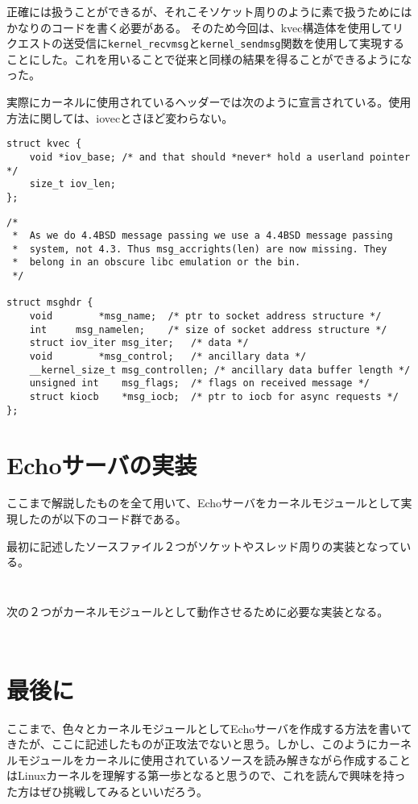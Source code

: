 正確には扱うことができるが、それこそソケット周りのように素で扱うためにはかなりのコードを書く必要がある。
そのため今回は、kvec構造体を使用してリクエストの送受信に\verb|kernel_recvmsg|と\verb|kernel_sendmsg|関数を使用して実現することにした。これを用いることで従来と同様の結果を得ることができるようになった。

実際にカーネルに使用されているヘッダーでは次のように宣言されている。使用方法に関しては、iovecとさほど変わらない。
\begin{verbatim}
struct kvec {
    void *iov_base; /* and that should *never* hold a userland pointer */
    size_t iov_len;
};
\end{verbatim}
\begin{verbatim}
/*
 *  As we do 4.4BSD message passing we use a 4.4BSD message passing
 *  system, not 4.3. Thus msg_accrights(len) are now missing. They
 *  belong in an obscure libc emulation or the bin.
 */
 
struct msghdr {
    void        *msg_name;  /* ptr to socket address structure */
    int     msg_namelen;    /* size of socket address structure */
    struct iov_iter msg_iter;   /* data */
    void        *msg_control;   /* ancillary data */
    __kernel_size_t msg_controllen; /* ancillary data buffer length */
    unsigned int    msg_flags;  /* flags on received message */
    struct kiocb    *msg_iocb;  /* ptr to iocb for async requests */
};
\end{verbatim}

\section{Echoサーバの実装}
ここまで解説したものを全て用いて、Echoサーバをカーネルモジュールとして実現したのが以下のコード群である。

最初に記述したソースファイル２つがソケットやスレッド周りの実装となっている。
\inputminted[frame=lines,framesep=2mm,baselinestretch=1.2,fontsize=\footnotesize,linenos,breaklines]{c}{\lrfasset/echo_server.c}
\inputminted[frame=lines,framesep=2mm,baselinestretch=1.2,fontsize=\footnotesize,linenos,breaklines]{c}{\lrfasset/echo_server.h}
次の２つがカーネルモジュールとして動作させるために必要な実装となる。
\inputminted[frame=lines,framesep=2mm,baselinestretch=1.2,fontsize=\footnotesize,linenos,breaklines]{c}{\lrfasset/fastecho.h}
\inputminted[frame=lines,framesep=2mm,baselinestretch=1.2,fontsize=\footnotesize,linenos,breaklines]{c}{\lrfasset/fastecho_module.c}

\section{最後に}
ここまで、色々とカーネルモジュールとしてEchoサーバを作成する方法を書いてきたが、ここに記述したものが正攻法でないと思う。しかし、このようにカーネルモジュールをカーネルに使用されているソースを読み解きながら作成することはLinuxカーネルを理解する第一歩となると思うので、これを読んで興味を持った方はぜひ挑戦してみるといいだろう。


